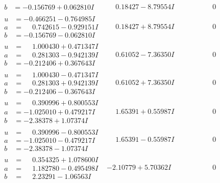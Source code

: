 \documentclass[1p]{elsarticle_modified}
\theoremstyle{definition}
\begin{document}
$$\begin{array}{c|c|c}
\begin{aligned}
b &= -0.156769 + 0.062810 I\end{aligned}
 & \phantom{-}0.18427 - 8.79554 I & \phantom{-0.000000 } 0 \\ \hline\begin{aligned}
u &= -0.466251 - 0.764985 I \\
a &= \phantom{-}0.742615 - 0.929151 I \\
b &= -0.156769 - 0.062810 I\end{aligned}
 & \phantom{-}0.18427 + 8.79554 I & \phantom{-0.000000 } 0 \\ \hline\begin{aligned}
u &= \phantom{-}1.000430 + 0.471347 I \\
a &= \phantom{-}0.281303 - 0.942139 I \\
b &= -0.212406 + 0.367643 I\end{aligned}
 & \phantom{-}0.61052 - 7.36350 I & \phantom{-0.000000 } 0 \\ \hline\begin{aligned}
u &= \phantom{-}1.000430 - 0.471347 I \\
a &= \phantom{-}0.281303 + 0.942139 I \\
b &= -0.212406 - 0.367643 I\end{aligned}
 & \phantom{-}0.61052 + 7.36350 I & \phantom{-0.000000 } 0 \\ \hline\begin{aligned}
u &= \phantom{-}0.390996 + 0.800553 I \\
a &= -1.025010 + 0.479217 I \\
b &= -2.38378 + 1.07374 I\end{aligned}
 & \phantom{-}1.65391 + 0.55987 I & \phantom{-0.000000 } 0 \\ \hline\begin{aligned}
u &= \phantom{-}0.390996 - 0.800553 I \\
a &= -1.025010 - 0.479217 I \\
b &= -2.38378 - 1.07374 I\end{aligned}
 & \phantom{-}1.65391 - 0.55987 I & \phantom{-0.000000 } 0 \\ \hline\begin{aligned}
u &= \phantom{-}0.354325 + 1.078600 I \\
a &= \phantom{-}1.182780 - 0.495498 I \\
b &= \phantom{-}2.23291 - 1.06563 I\end{aligned}
 & -2.10779 + 5.70362 I & \phantom{-0.000000 } 0 \\ \hline\begin{aligned}

\end{aligned}
\end{array}$$
\end{document}
